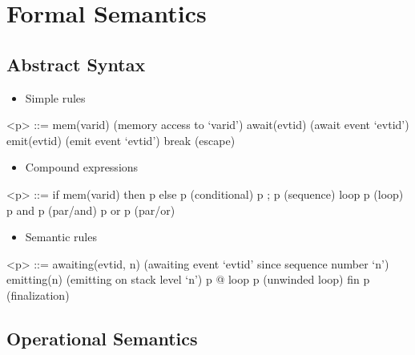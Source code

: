 \documentclass[9pt]{article}
\begin{document}
\section{Formal Semantics}

\subsection{Abstract Syntax}
\label{sub:syntax}

\begin{itemize}
  \item Simple rules
\end{itemize}

\begin{grammar}
<p> ::= mem(varid)                   \hfill (memory access to `varid')
\alt await(evtid)                    \hfill (await event `evtid')
\alt emit(evtid)                     \hfill (emit event `evtid')
\alt break                           \hfill (escape)
\end{grammar}

\begin{itemize}
  \item Compound expressions 
\end{itemize}

\begin{grammar}
<p> ::= if mem(varid) then p else p  \hfill (conditional) 
\alt p ; p                           \hfill (sequence)
\alt loop p                          \hfill (loop)
\alt p and p                         \hfill (par/and)
\alt p or p                          \hfill (par/or)
\end{grammar}

\begin{itemize}
  \item Semantic rules 
\end{itemize}

\begin{grammar}
<p> ::= awaiting(evtid, n)           \hfill (awaiting event `evtid' since sequence number `n')
\alt emitting(n)                     \hfill (emitting on stack level `n')
\alt p @ loop p                      \hfill (unwinded loop)
\alt fin p                           \hfill (finalization)

\end{grammar}

\subsection{Operational Semantics}
\label{sec:operational}
\end{document}
